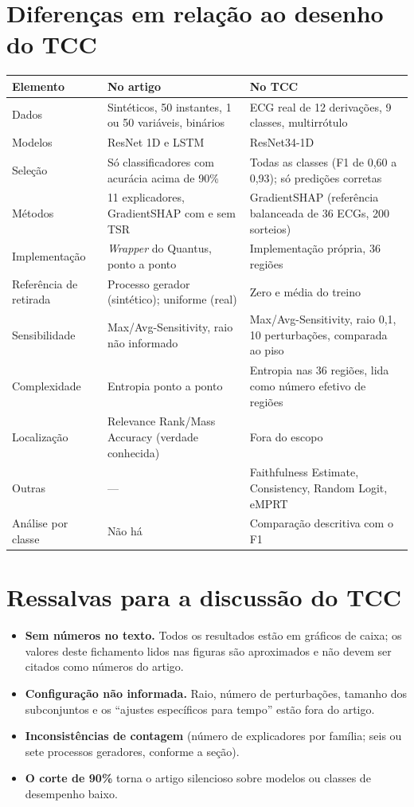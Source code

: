 \documentclass[11pt,a4paper]{article}
\begin{document}
\section{Diferenças em relação ao desenho do TCC}
\begin{center}\small
\begin{tabularx}{\linewidth}{lXX}
\toprule
\textbf{Elemento} & \textbf{No artigo} & \textbf{No TCC} \\
\midrule
Dados & Sintéticos, 50 instantes, 1 ou 50 variáveis, binários & ECG real de 12 derivações, 9 classes, multirrótulo \\
Modelos & ResNet 1D e LSTM & ResNet34-1D \\
Seleção & Só classificadores com acurácia acima de 90\% & Todas as classes (F1 de 0,60 a 0,93); só predições corretas \\
Métodos & 11 explicadores, GradientSHAP com e sem TSR & GradientSHAP (referência balanceada de 36 ECGs, 200 sorteios) \\
Implementação & \textit{Wrapper} do Quantus, ponto a ponto & Implementação própria, 36 regiões \\
Referência de retirada & Processo gerador (sintético); uniforme (real) & Zero e média do treino \\
Sensibilidade & Max/Avg-Sensitivity, raio não informado & Max/Avg-Sensitivity, raio 0,1, 10 perturbações, comparada ao piso \\
Complexidade & Entropia ponto a ponto & Entropia nas 36 regiões, lida como número efetivo de regiões \\
Localização & Relevance Rank/Mass Accuracy (verdade conhecida) & Fora do escopo \\
Outras & --- & Faithfulness Estimate, Consistency, Random Logit, eMPRT \\
Análise por classe & Não há & Comparação descritiva com o F1 \\
\bottomrule
\end{tabularx}
\end{center}

\section{Ressalvas para a discussão do TCC}
\begin{itemize}
\item \textbf{Sem números no texto.} Todos os resultados estão em gráficos de caixa; os valores deste fichamento lidos nas figuras são aproximados e não devem ser citados como números do artigo.
\item \textbf{Configuração não informada.} Raio, número de perturbações, tamanho dos subconjuntos e os ``ajustes específicos para tempo'' estão fora do artigo.
\item \textbf{Inconsistências de contagem} (número de explicadores por família; seis ou sete processos geradores, conforme a seção).
\item \textbf{O corte de 90\%} torna o artigo silencioso sobre modelos ou classes de desempenho baixo.
\end{itemize}
\end{document}
